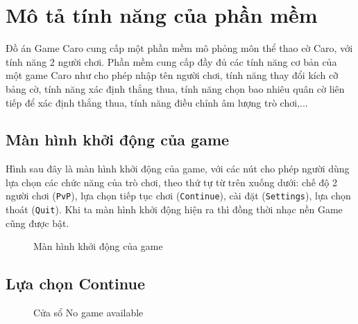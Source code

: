 \section{Mô tả tính năng của phần mềm}
Đồ án Game Caro cung cấp một phần mềm mô phỏng môn thể thao cờ Caro, với tính năng 2 người chơi. Phần mềm cung cấp đầy đủ các tính năng cơ bản của một game Caro như cho phép nhập tên người chơi, tính năng thay đổi kích cỡ bảng cờ, tính năng xác định thắng thua, tính năng chọn bao nhiêu quân cờ liên tiếp để xác định thắng thua, tính năng điều chỉnh âm lượng trò chơi,...

\subsection{Màn hình khởi động của game}
Hình sau đây là màn hình khởi động của game, với các nút cho phép người dùng lựa chọn các chức năng của trò chơi, theo thứ tự từ trên xuống dưới: chế độ 2 người chơi (\verb|PvP|), lựa chọn tiếp tục chơi (\verb|Continue|), cài đặt (\verb|Settings|), lựa chọn thoát (\verb|Quit|). Khi ta màn hình khởi động hiện ra thì đồng thời nhạc nền Game cũng được bật.

\begin{figure}[H]
\caption{Màn hình khởi động của game}
\end{figure}
\subsection{Lựa chọn Continue}
\begin{figure}[H]
\caption{Cửa sổ No game available}
\end{figure}
